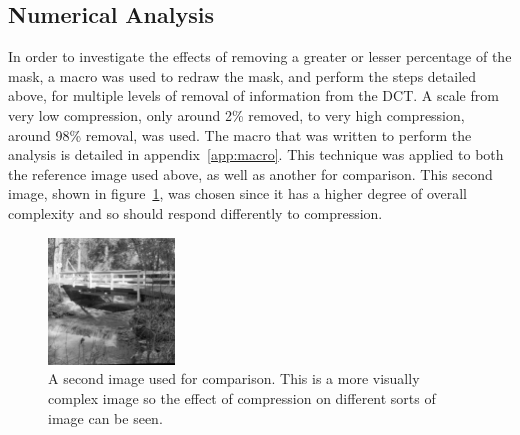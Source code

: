 	\subsection{Numerical Analysis} %
		\label{sub:numerical_analysis}
		In order to investigate the effects of removing a greater or lesser percentage of the mask, a macro was used to redraw the mask, and perform the steps detailed above, for multiple levels of removal of information from the DCT. A scale from very low compression, only around 2\% removed, to very high compression, around 98\% removal, was used. The macro that was written to perform the analysis is detailed in appendix~\ref{app:macro}. This technique was applied to both the reference image used above, as well as another for comparison. This second image, shown in figure~\ref{fig:bridge_original}, was chosen since it has a higher degree of overall complexity and so should respond differently to compression.
		\begin{figure}[ht]
			\centering
			\includegraphics[width=0.3\textwidth]{bridge.png}
			\caption{A second image used for comparison. This is a more visually complex image so the effect of compression on different sorts of image can be seen.\label{fig:bridge_original}}
		\end{figure}

